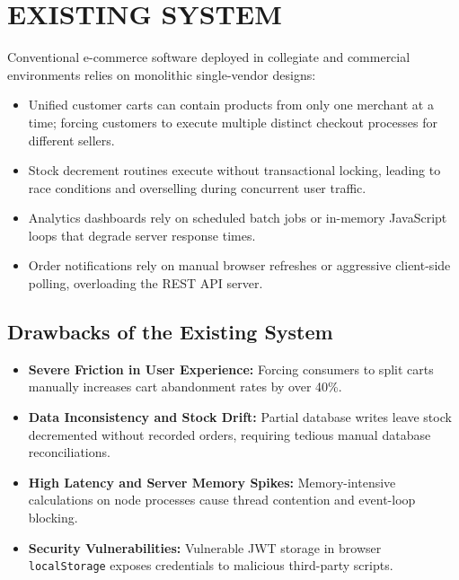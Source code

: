\documentclass[12pt,a4paper]{report}
\begin{document}
\section{EXISTING SYSTEM}
Conventional e-commerce software deployed in collegiate and commercial environments relies on monolithic single-vendor designs:
\begin{itemize}[leftmargin=1.5cm]
    \item Unified customer carts can contain products from only one merchant at a time; forcing customers to execute multiple distinct checkout processes for different sellers.
    \item Stock decrement routines execute without transactional locking, leading to race conditions and overselling during concurrent user traffic.
    \item Analytics dashboards rely on scheduled batch jobs or in-memory JavaScript loops that degrade server response times.
    \item Order notifications rely on manual browser refreshes or aggressive client-side polling, overloading the REST API server.
\end{itemize}

\subsection{Drawbacks of the Existing System}
\begin{itemize}[leftmargin=1.5cm]
    \item \textbf{Severe Friction in User Experience:} Forcing consumers to split carts manually increases cart abandonment rates by over 40\%.
    \item \textbf{Data Inconsistency and Stock Drift:} Partial database writes leave stock decremented without recorded orders, requiring tedious manual database reconciliations.
    \item \textbf{High Latency and Server Memory Spikes:} Memory-intensive calculations on node processes cause thread contention and event-loop blocking.
    \item \textbf{Security Vulnerabilities:} Vulnerable JWT storage in browser \texttt{localStorage} exposes credentials to malicious third-party scripts.
\end{itemize}
\end{document}
